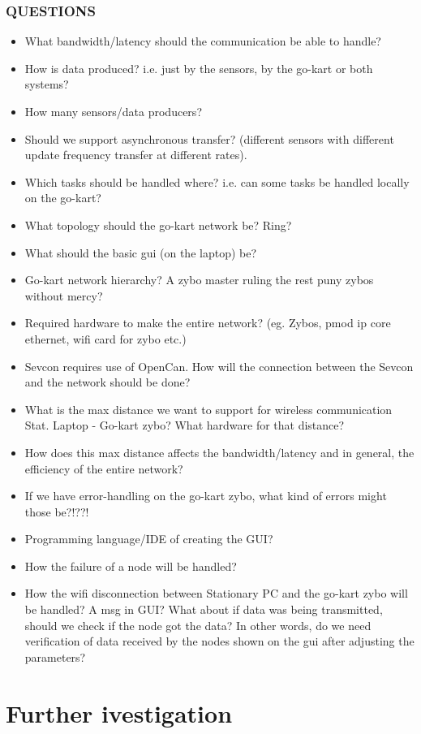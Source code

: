 \subsubsection{QUESTIONS}
\begin{itemize}{}
\item What bandwidth/latency should the communication be able to handle?
\item How is data produced? i.e. just by the sensors, by the go-kart or both systems?
\item How many sensors/data producers?
\item Should we support asynchronous transfer? (different sensors with different 
update frequency transfer at different rates).
\item Which tasks should be handled where? i.e. can some tasks be handled locally on 
the go-kart?
\item What topology should the go-kart network be? Ring?
\item What should the basic gui (on the laptop) be?
\item Go-kart network hierarchy? A zybo master ruling the rest puny zybos without mercy?
\item Required hardware to make the entire network? (eg. Zybos, pmod ip core ethernet, wifi card for zybo etc.)
\item Sevcon requires use of OpenCan. How will the connection between the Sevcon and the network should be done?
\item What is the max distance we want to support for wireless communication Stat. Laptop - Go-kart zybo? What hardware for that distance?
\item How does this max distance affects the bandwidth/latency and in general, the efficiency of the entire network?
\item If we have error-handling on the go-kart zybo, what kind of errors might those be?!??!
\item Programming language/IDE of creating the GUI?
\item How the failure of a node will be handled?
\item How the wifi disconnection between Stationary PC and the go-kart zybo will be handled? A msg in GUI? What about if data was being transmitted, should we check if the node got the data? In other words, do we need verification of data received by the nodes shown on the gui after adjusting the parameters?

\end{itemize}


\section{Further ivestigation}
